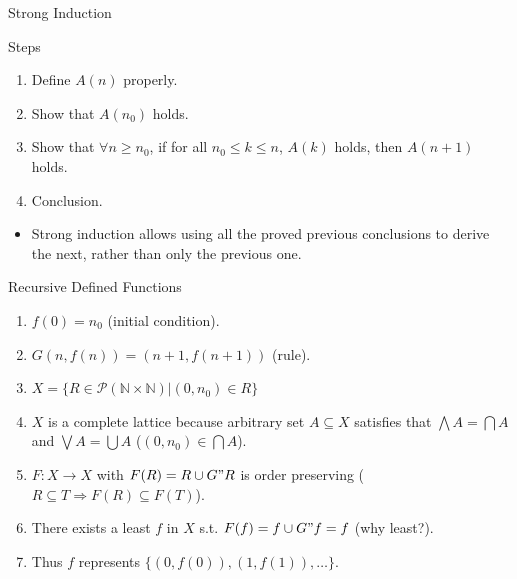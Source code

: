 \begin{frame}{Strong Induction}
    \begin{block}{Steps}
        \begin{enumerate}
            \item Define $A(n)$ properly.
            \item Show that $A(n_0)$ holds.
            \item Show that $\forall n\geq n_0$, if for all $n_0\leq k\leq n$, $A(k)$ holds, then $A(n+1)$ holds.
            \item Conclusion.
        \end{enumerate}
    \end{block}
    \begin{itemize}
        \item Strong induction allows using all the proved previous conclusions to derive the next, rather than only the previous one.
    \end{itemize}
\end{frame}

\begin{frame}{Recursive Defined Functions}
    \begin{enumerate}
        \item $f(0)=n_0$ (initial condition).
        \item $G(n,f(n))=(n+1,f(n+1))$ (rule).
        \item $X=\{R\in \mathcal{P}(\mathbb{N}\times\mathbb{N})|(0,n_0)\in R\}$
        \item $X$ is a complete lattice because arbitrary set $A\subseteq X$ satisfies that $\bigwedge A=\bigcap A$ and $\bigvee A=\bigcup A$ ($(0,n_0)\in\bigcap A$).
        \item $F:X\to X$ with $F(R)=R\cup G"R$ is order preserving ($R\subseteq T\Rightarrow F(R)\subseteq F(T)$).
        \item There exists a least $f$ in $X$ s.t. $F(f)=f\cup G"f=f$ (why least?).
        \item Thus $f$ represents $\{(0,f(0)), (1,f(1)),\hdots\}$.
    \end{enumerate}
\end{frame}

